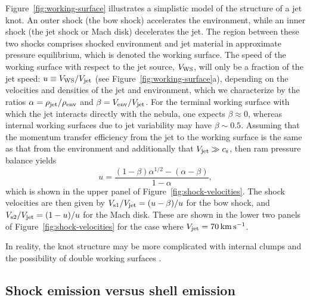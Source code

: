 \documentclass[useAMS, usenatbib]{mnras}
\begin{document}
Figure~\ref{fig:working-surface} illustrates a simplistic model of the structure of a jet knot.  An outer shock (the bow shock) accelerates the environment, while an inner shock (the jet shock or Mach disk) decelerates the jet.
The region between these two shocks comprises shocked environment and jet material in approximate pressure equilibrium,
which is denoted the working surface.
The speed of the working surface with respect to the jet source, \(V_{\mathrm{WS}}\),
will only be a fraction of the jet speed: \(u \equiv V_{\mathrm{WS}} / V_{\mathrm{jet}}\)
(see Figure~\ref{fig:working-surface}a),
depending on the velocities and densities of the jet and environment,
which we characterize by the ratios \(\alpha = \rho_{\mathrm{jet}}/\rho_{\mathrm{env}}\) and \(\beta = V_{\mathrm{env}}/V_{\mathrm{jet}}\).
For the terminal working surface with which the jet interacts directly with the nebula, one expects \(\beta \approx 0\),
whereas internal working surfaces due to jet variability may have \(\beta \sim 0.5\).
Assuming that the momentum transfer efficiency from the jet to the working surface is the same as that from the environment
and additionally that \(V_{\mathrm{jet}} \gg c_{\mathrm{s}}\), then ram pressure balance yields
\begin{equation}
  \label{eq:u}
  u = \frac{(1 - \beta)\alpha^{1/2} - (\alpha - \beta)}{1 - \alpha} , 
\end{equation}
which is shown in the upper panel of Figure~\ref{fig:shock-velocities}.
The shock velocities are then given by 
\(V_{\text{s1}}/V_{\mathrm{jet}} =  (u - \beta)/u \) for the bow shock,
and \(V_{\text{s2}}/V_{\mathrm{jet}} = (1 - u)/u \) for the Mach disk.
These are shown in the lower two panels of Figure~\ref{fig:shock-velocities}
for the case where \(V_{\mathrm{jet}} = \SI{70}{km.s^{-1}}\).

In reality, the knot structure may be more complicated
with internal clumps \citep{Hansen:2017a, Yirak:2009a, Yirak:2012a}
and the possibility of double working surfaces \citep{Raga:2017b}.  



\subsection{Shock emission versus shell emission}
\label{sec:shock-emiss-vers}




\end{document}
